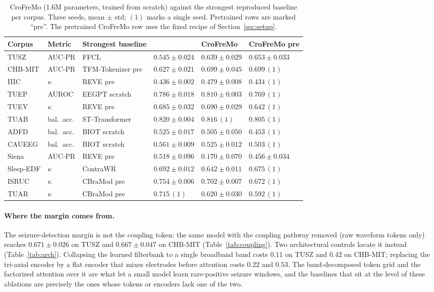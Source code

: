 \begin{table}[t]
\centering
\small
\caption{CroFreMo (1.6M parameters, trained from scratch) against the
strongest reproduced baseline per corpus. Three seeds, mean $\pm$ std; $(1)$
marks a single seed. Pretrained rows are marked ``pre''. The pretrained
CroFreMo row uses the fixed recipe of Section~\ref{sec:setup}.}
\label{tab:main}
\begin{tabular}{llllll}
\toprule
Corpus & Metric & Strongest baseline & & CroFreMo & CroFreMo pre \\
\midrule
TUSZ & AUC-PR & FFCL & $0.545 \pm 0.024$ & $\mathbf{0.639 \pm 0.029}$ & $0.653 \pm 0.033$ \\
CHB-MIT & AUC-PR & TFM-Tokenizer pre & $0.627 \pm 0.021$ & $\mathbf{0.699 \pm 0.045}$ & $0.699\,(1)$ \\
IIIC & $\kappa$ & REVE pre & $0.436 \pm 0.002$ & $\mathbf{0.479 \pm 0.008}$ & $0.434\,(1)$ \\
TUEP & AUROC & EEGPT scratch & $0.786 \pm 0.018$ & $\mathbf{0.810 \pm 0.003}$ & $0.769\,(1)$ \\
TUEV & $\kappa$ & REVE pre & $0.685 \pm 0.032$ & $0.690 \pm 0.029$ & $0.642\,(1)$ \\
TUAB & bal.\ acc. & ST-Transformer & $0.820 \pm 0.004$ & $0.816\,(1)$ & $0.805\,(1)$ \\
ADFD & bal.\ acc. & BIOT scratch & $0.525 \pm 0.017$ & $0.505 \pm 0.050$ & $0.453\,(1)$ \\
CAUEEG & bal.\ acc. & BIOT scratch & $0.561 \pm 0.009$ & $0.525 \pm 0.012$ & $0.503\,(1)$ \\
Siena & AUC-PR & REVE pre & $0.518 \pm 0.096$ & $0.170 \pm 0.070$ & $0.456 \pm 0.034$ \\
Sleep-EDF & $\kappa$ & ContraWR & $0.692 \pm 0.012$ & $0.642 \pm 0.011$ & $0.675\,(1)$ \\
ISRUC & $\kappa$ & CBraMod pre & $0.754 \pm 0.006$ & $0.702 \pm 0.007$ & $0.672\,(1)$ \\
TUAR & $\kappa$ & CBraMod pre & $0.715\,(1)$ & $0.620 \pm 0.030$ & $0.592\,(1)$ \\
\bottomrule
\end{tabular}
\end{table}

\paragraph{Where the margin comes from.}
The seizure-detection margin is not the coupling token: the same model with
the coupling pathway removed (raw waveform tokens only) reaches
$0.671 \pm 0.026$ on TUSZ and $0.667 \pm 0.047$ on CHB-MIT
(Table~\ref{tab:coupling}). Two architectural controls locate it instead
(Table~\ref{tab:arch}). Collapsing the learned filterbank to a single
broadband band costs $0.11$ on TUSZ and $0.42$ on CHB-MIT; replacing the
tri-axial encoder by a flat encoder that mixes electrodes before attention
costs $0.22$ and $0.53$. The band-decomposed token grid and the factorized
attention over it are what let a small model learn rare-positive seizure
windows, and the baselines that sit at the level of these ablations are
precisely the ones whose tokens or encoders lack one of the two.

